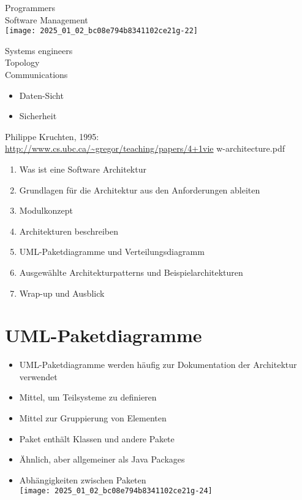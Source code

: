\documentclass[10pt]{article}
\begin{document}
Programmers\\
Software Management\\
\texttt{[image: 2025\_01\_02\_bc08e794b8341102ce21g-22]}

Systems engineers\\
Topology\\
Communications

\begin{itemize}
  \item Daten-Sicht
  \item Sicherheit
\end{itemize}

Philippe Kruchten, 1995:\\
\href{http://www.cs.ubc.ca/~gregor/teaching/papers/4+1vie}{http://www.cs.ubc.ca/\~{}gregor/teaching/papers/4+1vie} w-architecture.pdf

\begin{enumerate}
  \item Was ist eine Software Architektur
  \item Grundlagen für die Architektur aus den Anforderungen ableiten
  \item Modulkonzept
  \item Architekturen beschreiben
  \item UML-Paketdiagramme und Verteilungsdiagramm
  \item Ausgewählte Architekturpatterns und Beispielarchitekturen
  \item Wrap-up und Ausblick
\end{enumerate}

\section*{UML-Paketdiagramme}
\begin{itemize}
  \item UML-Paketdiagramme werden häufig zur Dokumentation der Architektur verwendet
  \item Mittel, um Teilsysteme zu definieren
  \item Mittel zur Gruppierung von Elementen
  \item Paket enthält Klassen und andere Pakete
  \item Ähnlich, aber allgemeiner als Java Packages
  \item Abhängigkeiten zwischen Paketen\\
\texttt{[image: 2025\_01\_02\_bc08e794b8341102ce21g-24]}
\end{itemize}
\end{document}
